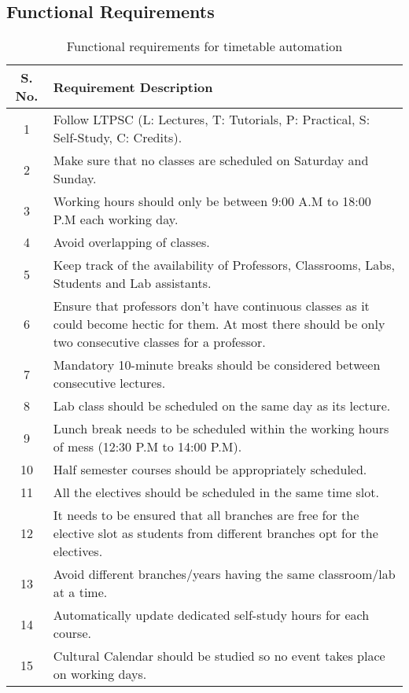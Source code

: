\documentclass[12pt]{article}
\begin{document}
\subsection*{Functional Requirements}
\begin{table}[H]
\centering
\begin{tabular}{|c|p{12cm}|}
\hline
\textbf{S. No.} & \textbf{Requirement Description} \\ \hline
1 & Follow LTPSC (L: Lectures, T: Tutorials, P: Practical, S: Self-Study, C: Credits). \\ \hline
2 & Make sure that no classes are scheduled on Saturday and Sunday. \\ \hline
3 & Working hours should only be between 9:00 A.M to 18:00 P.M each working day. \\ \hline
4 & Avoid overlapping of classes. \\ \hline
5 & Keep track of the availability of Professors, Classrooms, Labs, Students and Lab assistants. \\ \hline
6 & Ensure that professors don't have continuous classes as it could become hectic for them. At most there should be only two consecutive classes for a professor. \\ \hline
7 & Mandatory 10-minute breaks should be considered between consecutive lectures. \\ \hline
8 & Lab class should be scheduled on the same day as its lecture. \\ \hline
9 & Lunch break needs to be scheduled within the working hours of mess (12:30 P.M to 14:00 P.M). \\ \hline
10 & Half semester courses should be appropriately scheduled. \\ \hline
11 & All the electives should be scheduled in the same time slot. \\ \hline
12 & It needs to be ensured that all branches are free for the elective slot as students from different branches opt for the electives. \\ \hline
13 & Avoid different branches/years having the same classroom/lab at a time. \\ \hline
14 & Automatically update dedicated self-study hours for each course. \\ \hline
15 & Cultural Calendar should be studied so no event takes place on working days. \\ \hline
\end{tabular}
\caption{Functional requirements for timetable automation}
\label{tab:functional}
\end{table}
\end{document}
